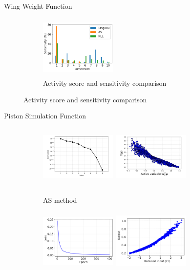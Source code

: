 \documentclass[10pt]{beamer}
\begin{document}
\begin{frame}{Wing Weight Function}
\begin{figure}
\begin{subfigure}{0.3\textwidth}
    \includegraphics[height=1.25in,width=1.5in]{images/wingsens.png}
    \captionsetup{justification=centering}
    \caption{Activity score and sensitivity comparison}
\end{subfigure}
\end{figure}
\end{frame}


\begin{frame}{Piston Simulation Function}
\begin{figure}
\begin{subfigure}{0.3\textwidth}
    \includegraphics[height=1.25in,width=1.5in]{images/pistoneigen (1).png}
    \includegraphics[height=1.25in,width=1.5in]{images/pistonas.png}
    \caption{AS method}
\end{subfigure}
\hfill
\begin{subfigure}{0.3\textwidth}
    \includegraphics[height=1.25in,width=1.5in]{images/Pistonloss.png}
    \includegraphics[height=1.25in,width=1.5in]{images/newPistonnll.png}

\end{subfigure}
\end{figure}
\end{frame}
\end{document}
